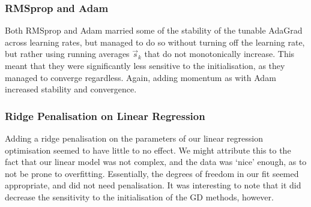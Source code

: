     \subsubsection{RMSprop and Adam}
        Both RMSprop and Adam married some of the stability of the tunable AdaGrad across learning rates, but managed to do so without turning off the learning rate, but rather using running averages $\vec{s}_k$ that do not monotonically increase. This meant that they were significantly less sensitive to the initialisation, as they managed to converge regardless. Again, adding momentum as with Adam increased stability and convergence. 

    \subsubsection{Ridge Penalisation on Linear Regression}
        Adding a ridge penalisation on the parameters of our linear regression optimisation seemed to have little to no effect. We might attribute this to the fact that our linear model was not complex, and the data was `nice' enough, as to not be prone to overfitting. Essentially, the degrees of freedom in our fit seemed appropriate, and did not need penalisation. It was interesting to note that it did decrease the sensitivity to the initialisation of the GD methods, however.
